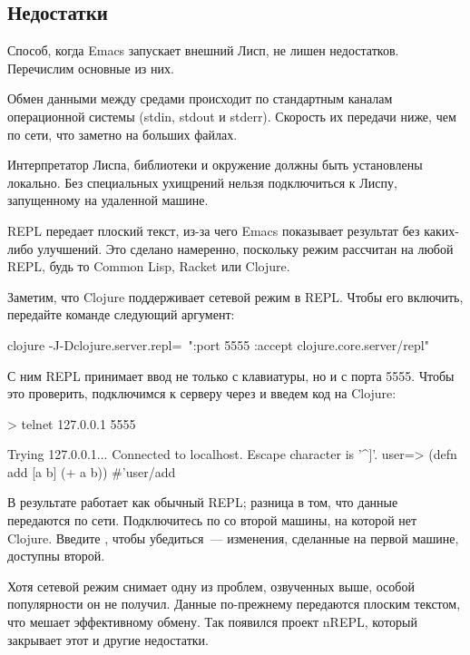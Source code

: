 \subsection{Недостатки}

Способ, когда Emacs запускает внешний Лисп, не лишен недостатков. Перечислим основные из них.

Обмен данными между средами происходит по стандартным каналам операционной системы (stdin, stdout и stderr). Скорость их передачи ниже, чем по сети, что заметно на больших файлах.

Интерпретатор Лиспа, библиотеки и окружение должны быть установлены локально. Без специальных ухищрений нельзя подключиться к Лиспу, запущенному на удаленной машине.

REPL передает плоский текст, из-за чего Emacs показывает результат без каких-либо улучшений. Это сделано намеренно, поскольку режим  рассчитан на любой REPL, будь то Common Lisp, Racket или Clojure.

Заметим, что Clojure поддерживает сетевой режим в REPL. Чтобы его включить, передайте команде  следующий аргумент:

\begin{english}
  \begin{bash}
clojure -J-Dclojure.server.repl=\
  "{:port 5555 :accept clojure.core.server/repl}"
  \end{bash}
\end{english}

С ним REPL принимает ввод не только с клавиатуры, но и с порта 5555. Чтобы это проверить, подключимся к серверу через  и введем код на Clojure:

\begin{english}
  \begin{text}
> telnet 127.0.0.1 5555

Trying 127.0.0.1...
Connected to localhost.
Escape character is '^]'.
user=> (defn add [a b] (+ a b))
#'user/add
  \end{text}
\end{english}

В результате  работает как обычный REPL; разница в том, что данные передаются по сети. Подключитесь по  со второй машины, на которой нет Clojure. Введите , чтобы убедиться~--- изменения, сделанные на первой машине, доступны второй.

Хотя сетевой режим снимает одну из проблем, озвученных выше, особой популярности он не получил. Данные по-прежнему передаются плоским текстом, что мешает эффективному обмену. Так появился проект nREPL, который закрывает этот и другие недостатки.

